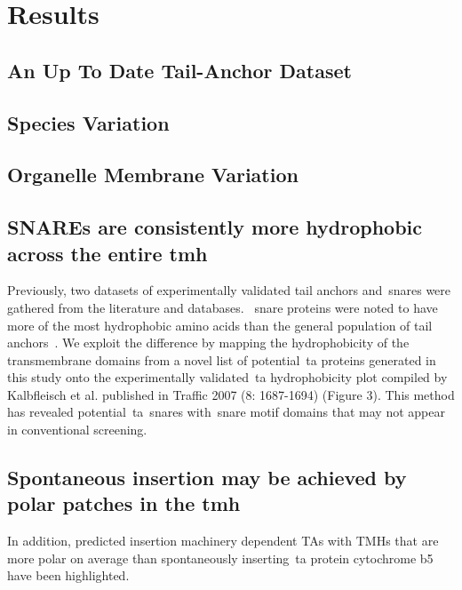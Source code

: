 \section{Results}

\subsection{An Up To Date Tail-Anchor Dataset}

\subsection{Species Variation}

\subsection{Organelle Membrane Variation}

\subsection{SNAREs are consistently more hydrophobic across the entire \gls{tmh}}

Previously, two datasets of experimentally validated tail anchors and~\gls{snare}s were gathered from the literature and databases.
~\gls{snare} proteins were noted to have more of the most hydrophobic amino acids than the general population of tail anchors~\cite{Kalbfleisch2007}.
We exploit the difference by mapping the hydrophobicity of the transmembrane domains from a novel list of potential~\gls{ta} proteins generated in this study onto the experimentally validated~\gls{ta} hydrophobicity plot compiled by Kalbfleisch et al. published in Traffic 2007 (8: 1687-1694) (Figure 3).
This method has revealed potential~\gls{ta}~\gls{snare}s with~\gls{snare} motif domains that may not appear in conventional screening.

\subsection{Spontaneous insertion may be achieved by polar patches in the \gls{tmh}}

In addition, predicted insertion machinery dependent TAs with TMHs that are more polar on average than spontaneously inserting~\gls{ta} protein cytochrome b5 have been highlighted.

